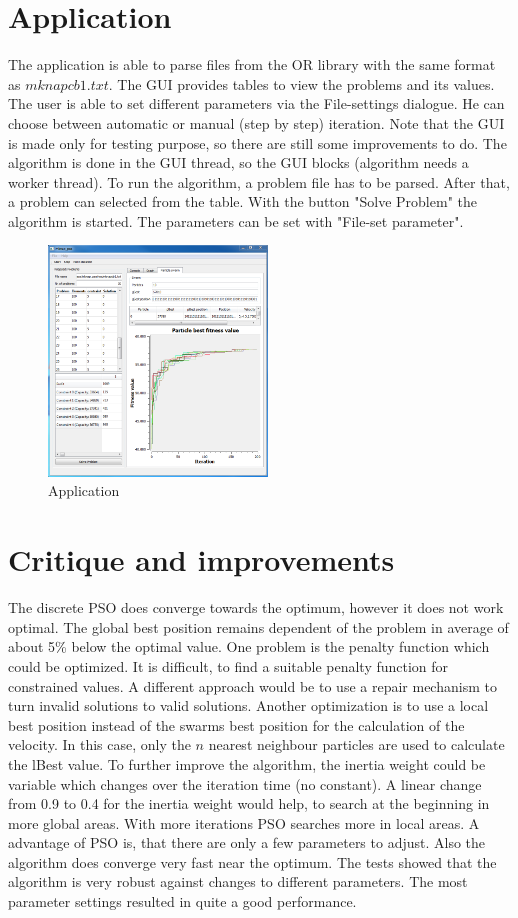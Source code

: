 \documentclass{article}
\begin{document}
\section{Application}
\label{lbl-app}
The application is able to parse files from the OR library with the same format as $mknapcb1.txt$. The GUI   provides tables to view the problems and its values. The user is able to set different parameters via the File-settings dialogue. He can choose between automatic or manual (step by step) iteration. Note that the GUI is made only for testing purpose, so there are still some improvements to do. The algorithm is done in the GUI thread, so the GUI blocks (algorithm needs a worker thread). To run the algorithm, a problem file has to be parsed. After that, a problem can selected from the table. With the button "Solve Problem" the algorithm is started. The parameters can be set with "File-set parameter".

\begin{figure}[H]
    \centering
    \includegraphics[width=220px]{images/image_main.PNG}
    \caption{Application}
    \label{fig-app}
\end{figure}

\section{Critique and improvements}
\label{lbl-impr}
The discrete PSO does converge towards the optimum, however it does not work optimal. The global best position remains dependent of the problem in average of about 5\% below the optimal value. One problem is the penalty function which could be optimized. It is difficult, to find a suitable penalty function for constrained values. A different approach would be to use a repair mechanism to turn invalid solutions to valid solutions. Another optimization is to use a local best position instead of the swarms best position for the calculation of the velocity. In this case, only the $n$ nearest neighbour particles are used to calculate the lBest value. To further improve the algorithm, the inertia weight could be variable which changes over the iteration time (no constant). A linear change from 0.9 to 0.4 for the inertia weight would help, to search at the beginning in more global areas. With more iterations PSO searches more in local areas. A advantage of PSO is, that there are only a few parameters to adjust. Also the algorithm does converge very fast near the optimum. The tests showed that the algorithm is very robust against changes to different parameters. The most parameter settings resulted in quite a good performance.
\end{document}
